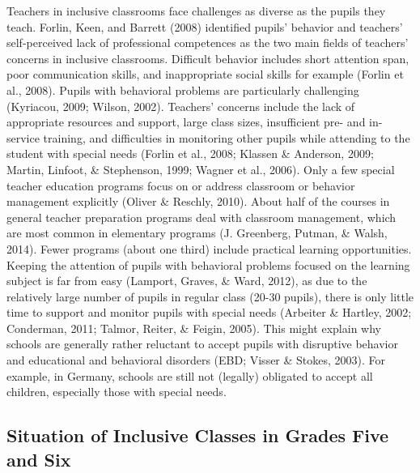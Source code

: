 \documentclass[11.5pt]{sig-alternate} %
\begin{document}
\begin{large}
Teachers in inclusive classrooms face challenges as diverse as the pupils they teach. Forlin, Keen, and Barrett (2008) identified pupils’ behavior and teachers’ self-perceived lack of professional competences as the two main fields of teachers’ concerns in inclusive classrooms. Difficult behavior includes short attention span, poor communication skills, and inappropriate social skills for example (Forlin et al., 2008). Pupils with behavioral problems are particularly challenging (Kyriacou, 2009; Wilson, 2002). Teachers’ concerns include the lack of appropriate resources and support, large class sizes, insufficient pre- and in-service training, and difficulties in monitoring other pupils while attending to the student with special needs (Forlin et al., 2008; Klassen \& Anderson, 2009; Martin, Linfoot, \& Stephenson, 1999; Wagner et al., 2006). Only a few special teacher education programs focus on or address classroom or behavior management explicitly (Oliver \& Reschly, 2010). About half of the courses in general teacher preparation programs deal with classroom management, which are most common in elementary programs (J. Greenberg, Putman, \& Walsh, 2014). Fewer programs (about one third) include practical learning opportunities. Keeping the attention of pupils with behavioral problems focused on the learning subject is far from easy (Lamport, Graves, \& Ward, 2012), as due to the relatively large number of pupils in regular class (20-30 pupils), there is only little time to support and monitor pupils with special needs (Arbeiter \& Hartley, 2002; Conderman, 2011; Talmor, Reiter, \& Feigin, 2005). This might explain why schools are generally rather reluctant to accept pupils with disruptive behavior and educational and behavioral disorders (EBD; Visser \& Stokes, 2003). For example, in Germany, schools are still not (legally) obligated to accept all children, especially those with special needs.

\subsection*{Situation of Inclusive Classes in Grades Five and Six}


\end{large}
\end{document}
